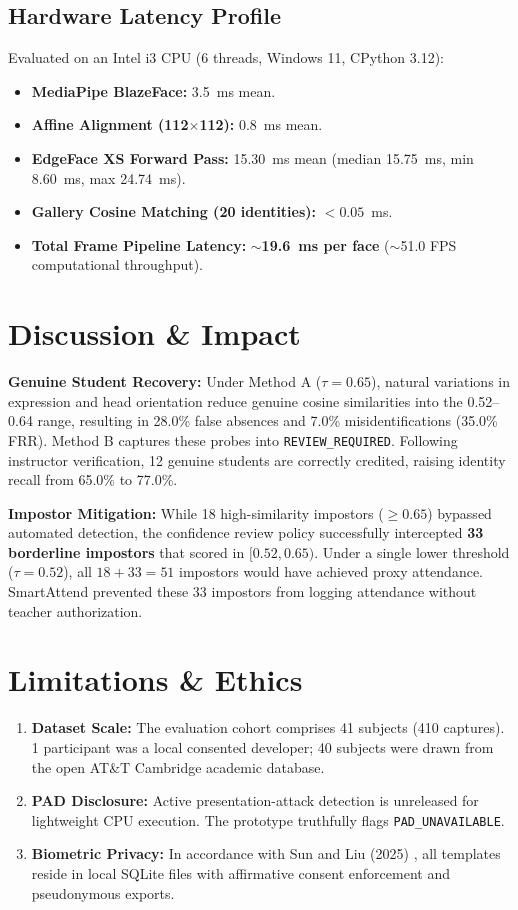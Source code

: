 \documentclass[conference]{IEEEtran}
\begin{document}
\subsection{Hardware Latency Profile}
Evaluated on an Intel i3 CPU (6 threads, Windows 11, CPython 3.12):
\begin{itemize}
    \item \textbf{MediaPipe BlazeFace:} 3.5~ms mean.
    \item \textbf{Affine Alignment (112$\times$112):} 0.8~ms mean.
    \item \textbf{EdgeFace XS Forward Pass:} 15.30~ms mean (median 15.75~ms, min 8.60~ms, max 24.74~ms).
    \item \textbf{Gallery Cosine Matching (20 identities):} $<0.05$~ms.
    \item \textbf{Total Frame Pipeline Latency:} \textbf{$\sim$19.6~ms per face} ($\sim$51.0 FPS computational throughput).
\end{itemize}

\section{Discussion \& Impact}
\textbf{Genuine Student Recovery:} Under Method A ($\tau = 0.65$), natural variations in expression and head orientation reduce genuine cosine similarities into the 0.52--0.64 range, resulting in 28.0\% false absences and 7.0\% misidentifications (35.0\% FRR). Method B captures these probes into \texttt{REVIEW\_REQUIRED}. Following instructor verification, 12 genuine students are correctly credited, raising identity recall from 65.0\% to 77.0\%.

\textbf{Impostor Mitigation:} While 18 high-similarity impostors ($\ge 0.65$) bypassed automated detection, the confidence review policy successfully intercepted \textbf{33 borderline impostors} that scored in $[0.52, 0.65)$. Under a single lower threshold ($\tau = 0.52$), all $18 + 33 = 51$ impostors would have achieved proxy attendance. SmartAttend prevented these 33 impostors from logging attendance without teacher authorization.

\section{Limitations \& Ethics}
\begin{enumerate}
    \item \textbf{Dataset Scale:} The evaluation cohort comprises 41 subjects (410 captures). 1 participant was a local consented developer; 40 subjects were drawn from the open AT\&T Cambridge academic database.
    \item \textbf{PAD Disclosure:} Active presentation-attack detection is unreleased for lightweight CPU execution. The prototype truthfully flags \texttt{PAD\_UNAVAILABLE}.
    \item \textbf{Biometric Privacy:} In accordance with Sun and Liu (2025) \cite{sun2025privacy}, all templates reside in local SQLite files with affirmative consent enforcement and pseudonymous exports.
\end{enumerate}
\end{document}
